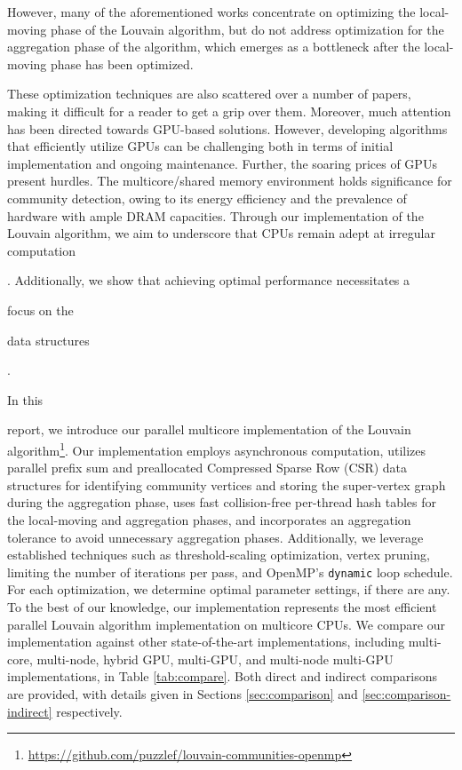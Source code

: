 However, many of the aforementioned works concentrate on optimizing the local-moving phase of the Louvain algorithm, but do not address optimization for the aggregation phase of the algorithm, which emerges as a bottleneck after the local-moving phase has been optimized. These optimization techniques are also scattered over a number of papers, making it difficult for a reader to get a grip over them. Moreover, much attention has been directed towards GPU-based solutions. However, developing algorithms that efficiently utilize GPUs can be challenging both in terms of initial implementation and ongoing maintenance. Further, the soaring prices of GPUs present hurdles. The multicore/shared memory environment holds significance for community detection, owing to its energy efficiency and the prevalence of hardware with ample DRAM capacities. Through our implementation of the Louvain algorithm, we aim to underscore that CPUs remain adept at irregular computation. Additionally, we show that achieving optimal performance necessitates a focus on the data structures.


In this report, we introduce our parallel multicore implementation of the Louvain algorithm\footnote{\url{https://github.com/puzzlef/louvain-communities-openmp}}. Our implementation employs asynchronous computation, utilizes parallel prefix sum and preallocated Compressed Sparse Row (CSR) data structures for identifying community vertices and storing the super-vertex graph during the aggregation phase, uses fast collision-free per-thread hash tables for the local-moving and aggregation phases, and incorporates an aggregation tolerance to avoid unnecessary aggregation phases. Additionally, we leverage established techniques such as threshold-scaling optimization, vertex pruning, limiting the number of iterations per pass, and OpenMP's \verb|dynamic| loop schedule. For each optimization, we determine optimal parameter settings, if there are any. To the best of our knowledge, our implementation represents the most efficient parallel Louvain algorithm implementation on multicore CPUs. We compare our implementation against other state-of-the-art implementations, including multi-core, multi-node, hybrid GPU, multi-GPU, and multi-node multi-GPU implementations, in Table \ref{tab:compare}. Both direct and indirect comparisons are provided, with details given in Sections \ref{sec:comparison} and \ref{sec:comparison-indirect} respectively.

